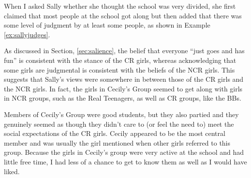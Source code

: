 When I asked Sally whether she thought the school was very divided, she first claimed that most people at the school got along but then added that there was some level of judgment by at least some people, as shown in Example \ref{ex:sallyjudges}.

\label{ex:sallyjudges}

\noindent As discussed in Section, \ref{sec:salience}, the belief that everyone ``just goes and has fun'' is consistent with the stance of the CR girls, whereas acknowledging that some girls are judgmental is consistent with the beliefs of the NCR girls.  This suggests that Sally's views were somewhere in between those of the CR girls and the NCR girls.   In fact, the girls in Cecily's Group seemed to get along with girls in NCR groups, such as the Real Teenagers, as well as CR groups, like the BBs.  

Members of Cecily's Group were good students, but they also partied and they genuinely seemed as though they didn't care to (or feel the need to) meet the social expectations of the CR girls.  Cecily appeared to be the most central member and was usually the girl mentioned when other girls referred to this group.  Because the girls in Cecily's group were very active at the school and had little free time, I had less of a chance to get to know them as well as I would have liked.  




